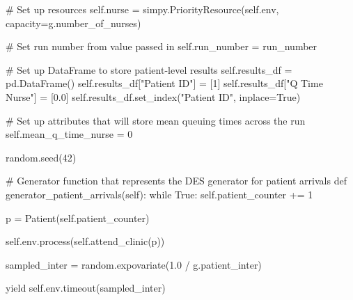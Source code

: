 \documentclass[
  letterpaper,
  DIV=11,
  numbers=noendperiod]{scrreprt}
\newenvironment{Shaded}{\begin{snugshade}}{\end{snugshade}}
\newcommand{\CommentTok}[1]{\textcolor[rgb]{0.37,0.37,0.37}{#1}}
\newcommand{\ControlFlowTok}[1]{\textcolor[rgb]{0.00,0.23,0.31}{#1}}
\newcommand{\DecValTok}[1]{\textcolor[rgb]{0.68,0.00,0.00}{#1}}
\newcommand{\FloatTok}[1]{\textcolor[rgb]{0.68,0.00,0.00}{#1}}
\newcommand{\KeywordTok}[1]{\textcolor[rgb]{0.00,0.23,0.31}{#1}}
\newcommand{\NormalTok}[1]{\textcolor[rgb]{0.00,0.23,0.31}{#1}}
\newcommand{\OperatorTok}[1]{\textcolor[rgb]{0.37,0.37,0.37}{#1}}
\newcommand{\StringTok}[1]{\textcolor[rgb]{0.13,0.47,0.30}{#1}}
\newcommand{\VariableTok}[1]{\textcolor[rgb]{0.07,0.07,0.07}{#1}}
\begin{document}
\begin{Shaded}
\begin{Highlighting}[]
        \CommentTok{\# Set up resources}
        \VariableTok{self}\NormalTok{.nurse }\OperatorTok{=}\NormalTok{ simpy.PriorityResource(}\VariableTok{self}\NormalTok{.env,}
\NormalTok{                                            capacity}\OperatorTok{=}\NormalTok{g.number\_of\_nurses)}

        \CommentTok{\# Set run number from value passed in}
        \VariableTok{self}\NormalTok{.run\_number }\OperatorTok{=}\NormalTok{ run\_number}

        \CommentTok{\# Set up DataFrame to store patient{-}level results}
        \VariableTok{self}\NormalTok{.results\_df }\OperatorTok{=}\NormalTok{ pd.DataFrame()}
        \VariableTok{self}\NormalTok{.results\_df[}\StringTok{"Patient ID"}\NormalTok{] }\OperatorTok{=}\NormalTok{ [}\DecValTok{1}\NormalTok{]}
        \VariableTok{self}\NormalTok{.results\_df[}\StringTok{"Q Time Nurse"}\NormalTok{] }\OperatorTok{=}\NormalTok{ [}\FloatTok{0.0}\NormalTok{]}
        \VariableTok{self}\NormalTok{.results\_df.set\_index(}\StringTok{"Patient ID"}\NormalTok{, inplace}\OperatorTok{=}\VariableTok{True}\NormalTok{)}

        \CommentTok{\# Set up attributes that will store mean queuing times across the run}
        \VariableTok{self}\NormalTok{.mean\_q\_time\_nurse }\OperatorTok{=} \DecValTok{0}

\NormalTok{        random.seed(}\DecValTok{42}\NormalTok{)}

    \CommentTok{\# Generator function that represents the DES generator for patient arrivals}
    \KeywordTok{def}\NormalTok{ generator\_patient\_arrivals(}\VariableTok{self}\NormalTok{):}
        \ControlFlowTok{while} \VariableTok{True}\NormalTok{:}
            \VariableTok{self}\NormalTok{.patient\_counter }\OperatorTok{+=} \DecValTok{1}

\NormalTok{            p }\OperatorTok{=}\NormalTok{ Patient(}\VariableTok{self}\NormalTok{.patient\_counter)}

            \VariableTok{self}\NormalTok{.env.process(}\VariableTok{self}\NormalTok{.attend\_clinic(p))}

\NormalTok{            sampled\_inter }\OperatorTok{=}\NormalTok{ random.expovariate(}\FloatTok{1.0} \OperatorTok{/}\NormalTok{ g.patient\_inter)}

            \ControlFlowTok{yield} \VariableTok{self}\NormalTok{.env.timeout(sampled\_inter)}


\end{Highlighting}
\end{Shaded}
\end{document}
